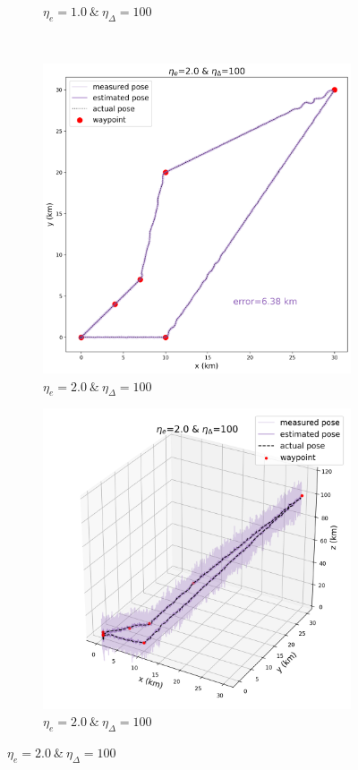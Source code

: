 \begin{figure}[]
\begin{subfigure}[t]{0.24\textwidth}
		\caption{$\eta_e=1.0\:\&\:\eta_\Delta=100$}
	\end{subfigure} \\
	\hfill
	\begin{subfigure}[t]{0.24\textwidth}
		\centering
		\includegraphics[width=\linewidth]{figures/lookahead_eta_20_100_2d.png}
		\caption{$\eta_e=2.0\:\&\:\eta_\Delta=100$}
	\end{subfigure} 
	\hfill
	\begin{subfigure}[t]{0.24\textwidth}
		\centering
		\includegraphics[width=\linewidth]{figures/lookahead_eta_20_100_3d.png}
		\caption{$\eta_e=2.0\:\&\:\eta_\Delta=100$}
	\end{subfigure} 
	

\end{figure}
